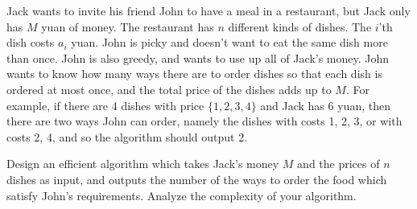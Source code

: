 \problem{}
Jack wants to invite his friend John to have a meal in a restaurant, but Jack only has $M$ yuan of money.  The restaurant has $n$ different kinds of dishes. The $i$'th dish costs $a_{i}$ yuan. John is picky and doesn't want to eat the same dish more than once.  John is also greedy, and wants to use up all of Jack's money.  John wants to know how many ways there are to order dishes so that each dish is ordered at most once, and the total price of the dishes adds up to $M$.   For example, if there are 4 dishes with price $\{1,2,3,4\}$ and Jack has $6$ yuan, then there are two ways John can order, namely the dishes with costs 1, 2, 3, or with costs 2, 4, and so the algorithm should output 2.

Design an efficient algorithm which takes Jack's money $M$ and the prices of $n$ dishes as input, and outputs the number of the ways to order the food which satisfy John's requirements. Analyze the complexity of your algorithm.


\solution{

}
\newpage